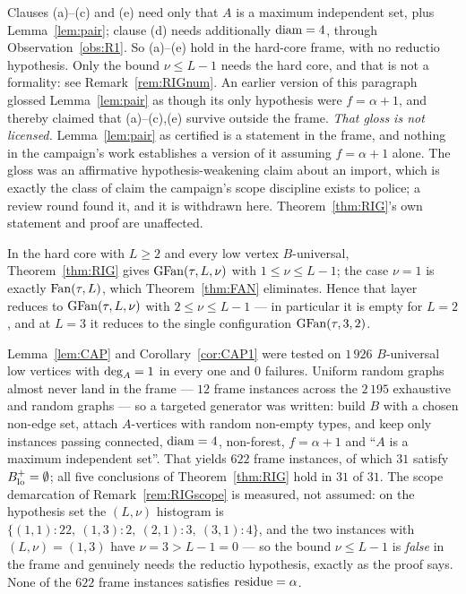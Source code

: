 \begin{remark}\label{rem:RIGscope}
Clauses (a)--(c) and (e) need only that $A$ is a maximum independent set, plus
Lemma~\ref{lem:pair}; clause (d) needs additionally $\operatorname{diam} = 4$, through
Observation~\ref{obs:R1}. So (a)--(e) hold in the hard-core frame, with no reductio
hypothesis. Only the bound $\nu \le L-1$ needs the hard core, and that is not a formality:
see Remark~\ref{rem:RIGnum}. An earlier version of this paragraph glossed
Lemma~\ref{lem:pair} as though its only hypothesis were $f = \alpha+1$, and thereby claimed
that (a)--(c),(e) survive outside the frame. \emph{That gloss is not licensed.}
Lemma~\ref{lem:pair} as certified is a statement in the frame, and nothing in the campaign's
work establishes a version of it assuming $f = \alpha+1$ alone. The gloss was an affirmative
hypothesis-weakening claim about an import, which is exactly the class of claim the
campaign's scope discipline exists to police; a review round found it, and it is withdrawn
here. Theorem~\ref{thm:RIG}'s own statement and proof are unaffected.
\end{remark}

\begin{corollary}\label{cor:RIG2}
In the hard core with $L \ge 2$ and every low vertex $B$-universal,
Theorem~\ref{thm:RIG} gives $\mathrm{GFan}(\tau,L,\nu)$ with $1 \le \nu \le L-1$; the case
$\nu = 1$ is exactly $\mathrm{Fan}(\tau,L)$, which Theorem~\ref{thm:FAN} eliminates. Hence that
layer reduces to $\mathrm{GFan}(\tau,L,\nu)$ with $2 \le \nu \le L-1$ --- in particular it is empty
for $L = 2$, and at $L = 3$ it reduces to the single configuration $\mathrm{GFan}(\tau,3,2)$.
\end{corollary}

\begin{remark}\label{rem:RIGnum}
Lemma~\ref{lem:CAP} and Corollary~\ref{cor:CAP1} were tested on $1\,926$ $B$-universal low
vertices with $\mathrm{deg}_A = 1$ in every one and $0$ failures. Uniform random graphs almost never
land in the frame --- $12$ frame instances across the $2\,195$ exhaustive and random graphs
--- so a targeted generator was written: build $B$ with a chosen non-edge set, attach
$A$-vertices with random non-empty types, and keep only instances passing connected,
$\operatorname{diam} = 4$, non-forest, $f = \alpha+1$ and ``$A$ is a maximum independent set''. That
yields $622$ frame instances, of which $31$ satisfy $B_{\mathrm{lo}}^{+} = \emptyset$; all five
conclusions of Theorem~\ref{thm:RIG} hold in $31$ of $31$. The scope demarcation of
Remark~\ref{rem:RIGscope} is measured, not assumed: on the hypothesis set the $(L,\nu)$
histogram is $\{(1,1):22,\ (1,3):2,\ (2,1):3,\ (3,1):4\}$, and the two instances with
$(L,\nu) = (1,3)$ have $\nu = 3 > L-1 = 0$ --- so the bound $\nu \le L-1$ is \emph{false} in
the frame and genuinely needs the reductio hypothesis, exactly as the proof says. None of
the $622$ frame instances satisfies $\operatorname{residue} = \alpha$.
\end{remark}


